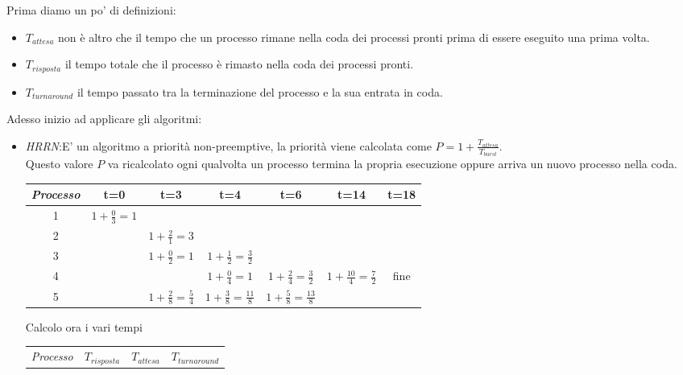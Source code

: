 \documentclass{article}
\begin{document}
   Prima diamo un po' di definizioni:
   \begin{itemize}
      \item $T_{attesa}$ non è altro che il tempo che un processo rimane nella coda dei processi pronti prima di essere eseguito una prima volta.
      \item $T_{risposta}$ il tempo totale che il processo è rimasto nella coda dei processi pronti.
      \item $T_{turnaround}$ il tempo passato tra la terminazione del processo e la sua entrata in coda.
   \end{itemize}
   Adesso inizio ad applicare gli algoritmi:
   \begin{itemize}
      \item \emph{HRRN}:E' un algoritmo a priorità non-preemptive, la priorità viene  calcolata come $P=1+\frac{T_{attesa}}{T_{burst}}$.\\
         Questo valore $P$ va ricalcolato ogni qualvolta un processo termina la propria esecuzione oppure arriva un nuovo processo nella coda.
         \begin{center}
            \begin{tabular}{|c|c|c|c|c|c|c|}
               \hline
               \emph{Processo} & t=0 & t=3 & t=4 & t=6 & t=14 & t=18\\
               \hline
               1 & \cellcolor{blue!25}$1+\frac{0}{3}=1$ & & & & & \\
               \hline
               2 & & \cellcolor{blue!25}$1+\frac{2}{1}=3$ & & & &\\
               \hline
               3 & & $1+\frac{0}{2}=1$ & \cellcolor{blue!25}$1+\frac{1}{2}=\frac{3}{2}$ & & &\\
               \hline
               4 & & & $1+\frac{0}{4}=1$ & $1+\frac{2}{4}=\frac{3}{2}$ & \cellcolor{blue!25}$1+\frac{10}{4}=\frac{7}{2}$ & fine\\
               \hline
               5 & & $1+\frac{2}{8}=\frac{5}{4}$ & $1+\frac{3}{8}=\frac{11}{8}$ & \cellcolor{blue!25}$1+\frac{5}{8}=\frac{13}{8}$ & & \\
               \hline
            \end{tabular}
         \end{center}
         Calcolo ora i vari tempi
         \begin{center}
            \begin{tabular}{|c|c|c|c|}
               \hline
               \emph{Processo} & $T_{risposta}$ & $T_{attesa}$ & $T_{turnaround}$\\

\end{tabular}
\end{center}
\end{itemize}
\end{document}
